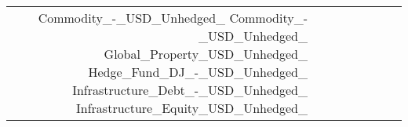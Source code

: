 \begin{tabular}{lrrrrrrrr}
 & Commodity_-_USD_Unhedged_%
Commodity_-_USD_Unhedged_%
Global_Property_USD_Unhedged_%
Hedge_Fund_DJ_-_USD_Unhedged_%
Infrastructure_Debt_-_USD_Unhedged_%
Infrastructure_Equity_USD_Unhedged_%

\end{tabular}
